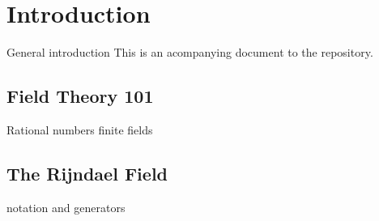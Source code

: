 
\chapter{Introduction}
General introduction
This is an acompanying document to the repository.

\section{Field Theory 101}
Rational numbers
finite fields

\section{The Rijndael Field}
notation and generators 
